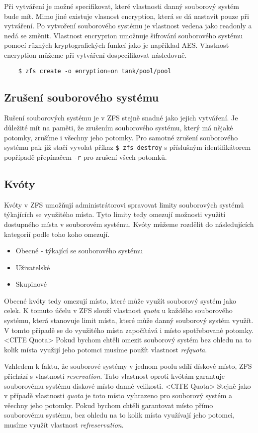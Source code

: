     Při vytváření je možné specifikovat, které vlastnosti danný souborový systém bude mít. Mimo jiné existuje vlasnost encryption, která se dá nastavit pouze při vytváření. Po vytvoření souborového systému je vlastnost vedena jako readonly a nedá se změnit. Vlastnost encryprion umožnuje šifrování souborového systému pomocí různých kryptografických funkcí jako je například AES. Vlastnost encryption můžeme při vytváření dospecifikovat následovně.
    \begin{verbatim}
    $ zfs create -o enryption=on tank/pool/pool
    \end{verbatim}
    \subsection{Zrušení souborového systému}
    Rušení souborových systému je v ZFS stejně snadné jako jejich vytváření. Je důležité mít na paměti, že zrušením souborového systému, který má nějaké potomky, zrušíme i všechny jeho potomky. Pro samotné zrušení souborového systému pak již stačí vyvolat příkaz \verb|$ zfs destroy| s příslušným identifikátorem popřípadě přepínačem \verb|-r| pro zrušení všech potomků.
    \subsection{Kvóty}
    \label{quota}
    Kvóty v ZFS umožňují administrátorovi spravovat limity souborových systémů týkajících se využitého místa. Tyto limity tedy omezují možnosti využití dostupného místa v souborovém systému. Kvóty můžeme rozdělit do následujících kategorií podle toho koho omezují.
    \begin{itemize}
      \item Obecné - týkající se souborového systému
      \item Uživatelské
      \item Skupinové
    \end{itemize}

    Obecné kvóty tedy omezují místo, které může využít souborový systém jako celek. K tomuto účelu v ZFS slouží vlastnost \emph{quota} u každého souborového systému, která stanovuje limit místa, které může danný souborový systém využít. V tomto případě se do využitého místa započítává i místo spotřebované potomky. <CITE Quota> Pokud bychom chtěli omezit souborový systém bez ohledu na to kolik místa využijí jeho potomci musíme použít vlastnost \emph{refquota}.

    Vzhledem k faktu, že souborové systémy v jednom poolu sdílí dískové místo, ZFS přichází s vlastností \emph{reservation}. Tato vlastnost oproti kvótám garantuje souborovému systému diskové místo danné velikosti. <CITE Quota> Stejně jako v případě vlastnosti \emph{quota} je toto místo vyhrazeno pro souborový systém a věechny jeho potomky. Pokud bychom chtěli garantovat místo přímo souborovému systému, bez ohledu na to kolik místa využívají jeho potomci, musíme využít vlastnost \emph{refreservation}.

